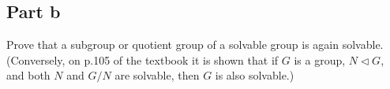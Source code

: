 \subsection{Part b}

\begin{question}
    Prove that a subgroup or quotient group of a solvable group is again solvable. (Conversely, on p.105 of the textbook it is shown that if $G$ is a group, $N \triangleleft G$, and both $N$ and $G / N$ are solvable, then $G$ is also solvable.)
\end{question}

\begin{answer}
    
\end{answer}